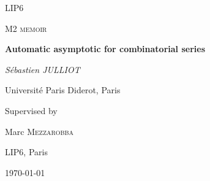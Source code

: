 \documentclass[../main_en.tex]{subfiles}
\begin{document}
\begin{titlepage}
	\centering
	{\scshape\LARGE LIP6 \par}
	\vspace{1cm}
	{\scshape\Large M2 memoir\par}
	\vspace{1.5cm}
	{\huge\bfseries Automatic asymptotic for combinatorial series\par}
	\vspace{2cm}
	{\Large\itshape Sébastien JULLIOT\par}
	Université Paris Diderot, Paris\par
	\vspace{2cm}
	
	Supervised by\par
	{\Large Marc \textsc{Mezzarobba}}\par
	LIP6, Paris
	
	\vfill
	
	{\large \monthyeardate\today\par}
\end{titlepage}
\end{document}
